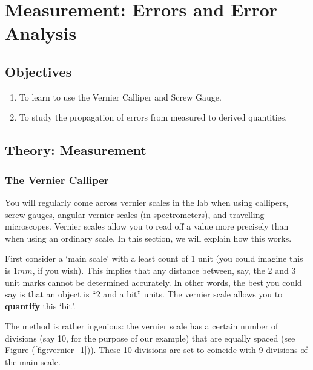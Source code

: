 
\chapter{Measurement: Errors and Error Analysis}
\section{Objectives}

\begin{enumerate}
    \item To learn to use the Vernier Calliper and Screw Gauge.
    \item To study the propagation of errors from measured to derived quantities.
\end{enumerate}


\section{Theory: Measurement}

\subsection{The Vernier Calliper}

You will regularly come across vernier scales in the lab when using callipers, screw-gauges, angular vernier scales (in spectrometers), and travelling microscopes. Vernier scales allow you to read off a value more precisely than when using an ordinary scale. In this section, we will explain how this works.

First consider a `main scale' with a least count of 1 unit (you could imagine this is $1mm$, if you wish). This implies that any distance between, say, the 2 and 3 unit marks cannot be determined accurately. In other words, the best you could say is that an object is ``2 and a bit'' units. The vernier scale allows you to \textbf{quantify} this `bit'.  

The method is rather ingenious: the vernier scale has a certain number of divisions (say 10, for the purpose of our example) that are equally spaced (see Figure (\ref{fig:vernier_1})). These 10 divisions are set to coincide with 9 divisions of the main scale.

